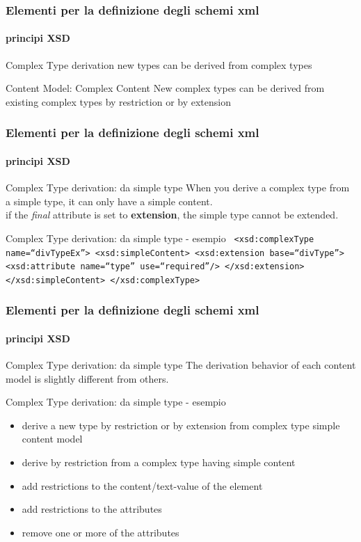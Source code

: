 \begin{frame}
	\frametitle{Elementi per la definizione degli schemi xml}
	\framesubtitle{principi XSD}
	\addtocounter{nframe}{1}

	\begin{block}{Complex Type derivation}
		new types can be derived from complex types
	\end{block}

	\begin{block}{Content Model: Complex Content}
		New complex types can be derived from existing complex types by restriction or by extension
	\end{block}
\end{frame}

\begin{frame}
	\frametitle{Elementi per la definizione degli schemi xml}
	\framesubtitle{principi XSD}
	\addtocounter{nframe}{1}

	\begin{block}{Complex Type derivation: da simple type}
		When you derive a complex type from a simple type, it can only have a simple content.
		\\if the \textit{final} attribute is set to \textbf{extension}, the simple type cannot be extended.

	\end{block}

	\begin{block}{Complex Type derivation: da simple type - esempio}
		\texttt{
			<xsd:complexType name=``divTypeEx''>
			<xsd:simpleContent>
			<xsd:extension base=``divType''>
			<xsd:attribute name=``type'' use=``required''/>
			</xsd:extension>
			</xsd:simpleContent>
			</xsd:complexType>
		}
	\end{block}
\end{frame}



\begin{frame}
	\frametitle{Elementi per la definizione degli schemi xml}
	\framesubtitle{principi XSD}
	\addtocounter{nframe}{1}

	\begin{block}{Complex Type derivation: da simple type}
		The derivation behavior of each content model is slightly different from others.
	\end{block}

	\begin{block}{Complex Type derivation: da simple type - esempio}
		\begin{itemize}
			\item derive a new type by restriction or by extension from complex type simple content model
			\item derive by restriction from a complex type having simple content
			\item add restrictions to the content/text-value of the element
			\item add restrictions to the attributes
			\item remove one or more of the attributes
		\end{itemize}
	\end{block}
\end{frame}


